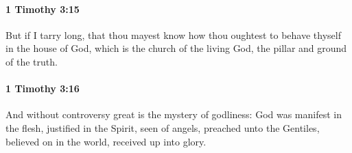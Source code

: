 		\paragraph{1 Timothy 3:15} %
			\label{1TIMOTHY-3-15}

			But if I tarry long, that thou mayest know how thou oughtest to behave thyself in the house of God, which is the church of the living God, the pillar and ground of the truth.

			\begin{framed}
			\scriptsize
				\begin{compactdesc}
					\item[SBLG] 
				\end{compactdesc}
			\end{framed}

		\paragraph{1 Timothy 3:16} %
			\label{1TIMOTHY-3-16}

			And without controversy great is the mystery of godliness: God was manifest in the flesh, justified in the Spirit, seen of angels, preached unto the Gentiles, believed on in the world, received up into glory.

